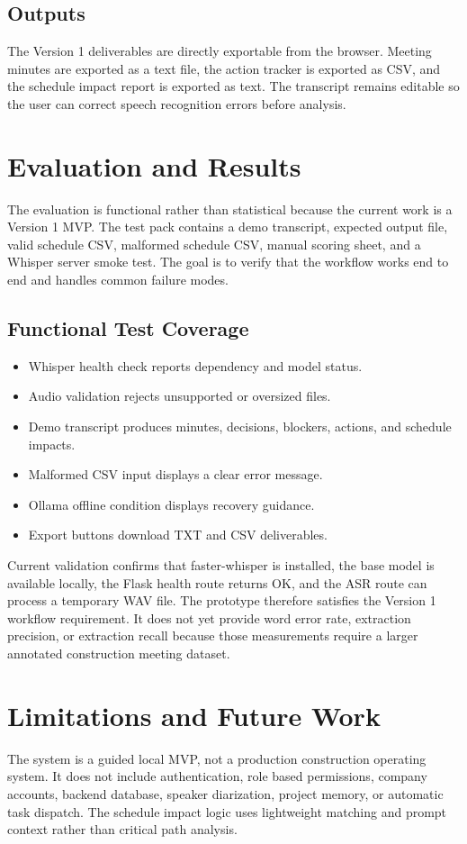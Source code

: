 \documentclass[conference]{IEEEtran}
\begin{document}
\subsection{Outputs}
The Version 1 deliverables are directly exportable from the browser. Meeting minutes are exported as a text file, the action tracker is exported as CSV, and the schedule impact report is exported as text. The transcript remains editable so the user can correct speech recognition errors before analysis.

\section{Evaluation and Results}
The evaluation is functional rather than statistical because the current work is a Version 1 MVP. The test pack contains a demo transcript, expected output file, valid schedule CSV, malformed schedule CSV, manual scoring sheet, and a Whisper server smoke test. The goal is to verify that the workflow works end to end and handles common failure modes.

\subsection{Functional Test Coverage}
\begin{itemize}
    \item Whisper health check reports dependency and model status.
    \item Audio validation rejects unsupported or oversized files.
    \item Demo transcript produces minutes, decisions, blockers, actions, and schedule impacts.
    \item Malformed CSV input displays a clear error message.
    \item Ollama offline condition displays recovery guidance.
    \item Export buttons download TXT and CSV deliverables.
\end{itemize}

Current validation confirms that faster-whisper is installed, the base model is available locally, the Flask health route returns OK, and the ASR route can process a temporary WAV file. The prototype therefore satisfies the Version 1 workflow requirement. It does not yet provide word error rate, extraction precision, or extraction recall because those measurements require a larger annotated construction meeting dataset.

\section{Limitations and Future Work}
The system is a guided local MVP, not a production construction operating system. It does not include authentication, role based permissions, company accounts, backend database, speaker diarization, project memory, or automatic task dispatch. The schedule impact logic uses lightweight matching and prompt context rather than critical path analysis.
\end{document}
